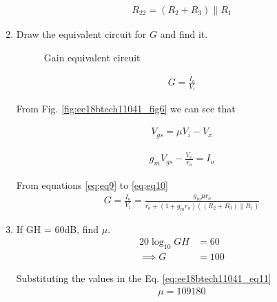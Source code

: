 \begin{enumerate}[label=\arabic*.,ref=\theenumi]
\begin{align}
    R_{22} = (R_2+R_3) \parallel R_1
\end{align}

\item Draw the equivalent circuit for $G$ and find it.
\\
\solution 
\begin{figure}[!ht]
	\begin{center}
		\resizebox{\columnwidth}{!}{}
	\end{center}
\caption{Gain equivalent circuit}
\label{fig:ee18btech11041_fig7}
\end{figure}
\begin{align}
    G = \frac{I_o}{V_i} 
    \label{eq;eq8}
\end{align}

From Fig. \ref{fig:ee18btech11041_fig6} we can see that
 
\begin{align}
    V_{gs} = \mu V_i - V_x
    \label{eq;eq9}
\end{align}

\begin{align}
    g_mV_{gs} - \frac{V_x}{r_o} = I_o
    \label{eq;eq10}
\end{align}

From equations \ref{eq;eq9} to \ref{eq;eq10}
\begin{align}
    G = \frac{I_o}{V_i} = \frac{g_m \mu r_o}{r_o + (1+g_m r_o)((R_2+R_3) \parallel R_1) }
    \label{eq:ee18btech11041_eq11}
\end{align}
\item If GH = 60dB, find $\mu$.
\\
\solution 
\begin{align}
    20\log_{10} GH &= 60 
    \label{eq:ee18btech11041_eq12}
\\
\implies G&=100
\end{align}

Substituting the values in the Eq. \ref{eq:ee18btech11041_eq11}
\begin{align}
    \mu = 109180
\end{align}
%
%



\end{enumerate}
